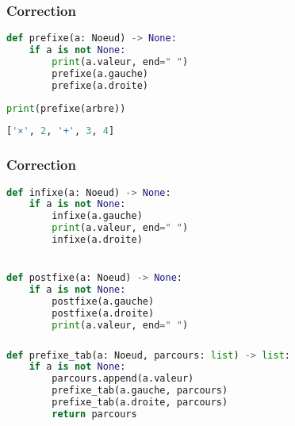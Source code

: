 \documentclass[svgnames,11pt]{beamer}
\begin{document}
\begin{frame}[fragile]
    \frametitle{Correction}

\begin{center}
\begin{lstlisting}[language=Python , basicstyle=\ttfamily\small, xleftmargin=1em, xrightmargin=1em]
def prefixe(a: Noeud) -> None:
    if a is not None:
        print(a.valeur, end=" ")
        prefixe(a.gauche)
        prefixe(a.droite)
\end{lstlisting}
\end{center}    
\begin{lstlisting}[language=Python , basicstyle=\ttfamily\small, xleftmargin=1em, xrightmargin=1em]
print(prefixe(arbre))
\end{lstlisting}
\begin{lstlisting}[language=Python , basicstyle=\ttfamily\small, xleftmargin=1em, xrightmargin=1em]
['×', 2, '+', 3, 4]\end{lstlisting}
\end{frame}
\begin{frame}[fragile]
    \frametitle{Correction}

\begin{center}
\begin{lstlisting}[language=Python , basicstyle=\ttfamily\small, xleftmargin=1em, xrightmargin=1em]
def infixe(a: Noeud) -> None:
    if a is not None:
        infixe(a.gauche)
        print(a.valeur, end=" ")
        infixe(a.droite)


def postfixe(a: Noeud) -> None:
    if a is not None:
        postfixe(a.gauche)
        postfixe(a.droite)
        print(a.valeur, end=" ")
\end{lstlisting}
\end{center}    

\end{frame}
\begin{frame}[fragile]
    \frametitle{}

\begin{center}
\begin{lstlisting}[language=Python , basicstyle=\ttfamily\small, xleftmargin=.5em, xrightmargin=0em]
def prefixe_tab(a: Noeud, parcours: list) -> list:
    if a is not None:
        parcours.append(a.valeur)
        prefixe_tab(a.gauche, parcours)
        prefixe_tab(a.droite, parcours)
        return parcours
\end{lstlisting}
\end{center}

\end{frame}
\end{document}
